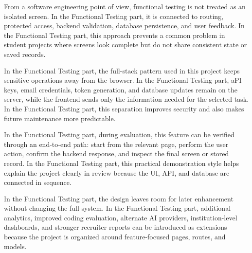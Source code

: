 \documentclass[12pt,a4paper]{report}
\begin{document}
From a software engineering point of view, functional testing is not treated as an isolated screen. In the Functional Testing part, it is connected to routing, protected access, backend validation, database persistence, and user feedback. In the Functional Testing part, this approach prevents a common problem in student projects where screens look complete but do not share consistent state or saved records.


In the Functional Testing part, the full-stack pattern used in this project keeps sensitive operations away from the browser. In the Functional Testing part, aPI keys, email credentials, token generation, and database updates remain on the server, while the frontend sends only the information needed for the selected task. In the Functional Testing part, this separation improves security and also makes future maintenance more predictable.


In the Functional Testing part, during evaluation, this feature can be verified through an end-to-end path: start from the relevant page, perform the user action, confirm the backend response, and inspect the final screen or stored record. In the Functional Testing part, this practical demonstration style helps explain the project clearly in review because the UI, API, and database are connected in sequence.


In the Functional Testing part, the design leaves room for later enhancement without changing the full system. In the Functional Testing part, additional analytics, improved coding evaluation, alternate AI providers, institution-level dashboards, and stronger recruiter reports can be introduced as extensions because the project is organized around feature-focused pages, routes, and models.
\end{document}
